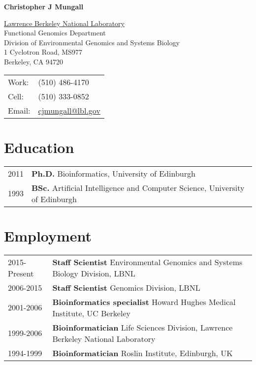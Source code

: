 \documentclass[11pt,fullpage]{article}
\def\name{Christopher J Mungall}
\begin{document}


\centerline{\Large \bf \name}

\vspace{0.25in}

\begin{minipage}{0.60\linewidth}
  \href{http://www.lbl.gov/}{Lawrence Berkeley National Laboratory} \\
  Functional Genomics Department \\
  Division of Environmental Genomics and Systems Biology \\
  1 Cyclotron Road, MS977 \\
  Berkeley, CA 94720
\end{minipage}
\begin{minipage}{0.40\linewidth}
  \begin{tabular}{ll}
    Work: & (510) 486-4170 \\
    Cell: & (510) 333-0852 \\
    Email: & \href{mailto:cjmungall@lbl.gov}{cjmungall@lbl.gov} \\
  \end{tabular}
\end{minipage}

\section*{Education}

\begin{tabular}{ll}
	2011 & {\bf Ph.D.} Bioinformatics, University of Edinburgh \\
	1993 & {\bf BSc.} Artificial Intelligence and Computer
        Science, University of Edinburgh \\
\end{tabular}

\section*{Employment}


\begin{tabular}{ll}
	2015-Present & {\bf Staff Scientist} Environmental Genomics and Systems Biology Division, LBNL \\
	2006-2015 & {\bf Staff Scientist} Genomics Division, LBNL \\
	2001-2006 & {\bf Bioinformatics specialist} Howard Hughes
        Medical Institute, UC Berkeley \\
	1999-2006 & {\bf Bioinformatician} Life Sciences Division, Lawrence
        Berkeley National Laboratory \\
	1994-1999 & {\bf Bioinformatician} Roslin Institute,
        Edinburgh, UK \\
\end{tabular}
\end{document}
